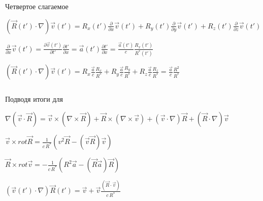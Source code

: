 \documentclass[11pt]{article}
\makeatletter
\newcommand{\boxspacing}{\kern\kvtcb@left@rule\kern\kvtcb@boxsep}
\newcommand{\prompt}[4]{
        {\ttfamily\llap{{\color{#2}[#3]:\hspace{3pt}#4}}\vspace{-\baselineskip}}
    }
\makeatother
\begin{document}
    Четвертое слагаемое

\(\left(\overrightarrow{R}\left(t'\right) \cdot \nabla\right) \overrightarrow{v}\left(t'\right)  = R_x\left(t'\right) \frac{\partial}{\partial x} \overrightarrow{v}\left(t'\right)  + R_y\left(t'\right) \frac{\partial}{\partial y} \overrightarrow{v}\left(t'\right)  + R_z\left(t'\right) \frac{\partial}{\partial z} \overrightarrow{v}\left(t'\right)\)

    \(\frac{\partial}{\partial x} \vec v\left(t'\right)  = \frac{\partial \vec v\left(t'\right)}{\partial t'} \frac{\partial t'}{\partial x}  = \vec a\left(t'\right) \frac{\partial t'}{\partial x}  = \frac{\vec a\left(t'\right)}{c} \frac{R_x\left(t'\right)}{{{R}^{*}}\left(t'\right)}\)

    \(\left(\overrightarrow{R}\left(t'\right) \cdot \nabla\right) \overrightarrow{v}\left(t'\right)  = R_x \frac{\vec a}{c} \frac{R_x}{{{R}^{*}}}  + R_y \frac{\vec a}{c} \frac{R_y}{{{R}^{*}}}  + R_z \frac{\vec a}{c} \frac{R_z}{{{R}^{*}}}  = \frac{\vec a}{c} \frac{R^2}{{{R}^{*}}}\)

    \begin{tcolorbox}[breakable, size=fbox, boxrule=1pt, pad at break*=1mm,colback=cellbackground, colframe=cellborder]
\prompt{In}{incolor}{ }{\boxspacing}
\begin{Verbatim}[commandchars=\\\{\}]

\end{Verbatim}
\end{tcolorbox}

    Подводя итоги для

\(\nabla \left(\overrightarrow{v}\cdot \overrightarrow{R}\right)  = \overrightarrow{v} \times \left(\nabla \times \overrightarrow{R}\right)  + \overrightarrow{R} \times \left(\nabla \times \overrightarrow{v}\right)  + \left(\overrightarrow{v} \cdot \nabla\right) \overrightarrow{R}  + \left(\overrightarrow{R} \cdot \nabla\right) \overrightarrow{v}\)

    \(\vec v \times rot \overrightarrow{R}=\frac{1}{c\,{{R}^{*}}}\left(v^2 \vec R - \left(\vec v \vec R\right) \vec v\right)\)

    \(\vec R \times rot \overrightarrow{v}=-\frac{1}{c\,{{R}^{*}}}\left(R^2 \vec a - \left(\vec R \vec a\right) \vec R\right)\)

    \(\left(\overrightarrow{v}\left(t'\right) \cdot \nabla\right) \overrightarrow{R}\left(t'\right)  = \vec v + \vec v \frac{\left(\vec R \cdot \vec v\right)}{c\,{{R}^{*}}}\)
\end{document}
